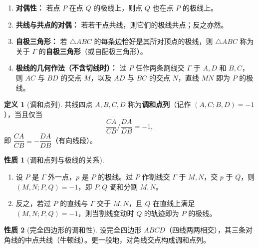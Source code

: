 \documentclass[12pt,a4paper]{ctexart}
\theoremstyle{definition}
\newtheorem*{defn}{定义}
\newtheorem*{prop}{性质}
\begin{document}
\begin{knowledgebox}
\begin{enumerate}[label=\textbf{(\arabic*)},leftmargin=2em]
  \item \textbf{对偶性：} 若点 $P$ 在点 $Q$ 的极线上，则点 $Q$ 也在点 $P$ 的极线上。
  \item \textbf{共线与共点的对偶：} 若若干点共线，则它们的极线共点；反之亦然。
  \item \textbf{自极三角形：} 若 $\triangle ABC$ 的每条边恰好是其所对顶点的极线，则 $\triangle ABC$ 称为关于 $\Gamma$ 的\textbf{自极三角形}（或自配极三角形）。
  \item \textbf{极线的几何作法（不含切线时）：} 过 $P$ 任作两条割线交 $\Gamma$ 于 $A,D$ 和 $B,C$，则 $AC$ 与 $BD$ 的交点 $M$，以及 $AD$ 与 $BC$ 的交点 $N$，直线 $MN$ 即为 $P$ 的极线。
\end{enumerate}
\end{knowledgebox}

\begin{knowledgebox}
\begin{defn}[调和点列]
共线四点 $A,B,C,D$ 称为\textbf{调和点列}（记作 $(A,C;B,D)=-1$），当且仅当
\[
  \frac{CA}{CB}\bigg/\frac{DA}{DB}=-1,
\]
即 $\dfrac{CA}{CB}=-\dfrac{DA}{DB}$（有向线段）。
\end{defn}

\begin{prop}[调和点列与极线的关系]
\begin{enumerate}[label=(\arabic*),leftmargin=2em]
  \item 设 $P$ 是 $\Gamma$ 外一点，$p$ 是 $P$ 的极线。过 $P$ 作割线交 $\Gamma$ 于 $M,N$，交 $p$ 于 $Q$，则 $(M,N;P,Q)=-1$，即 $P,Q$ 调和分割 $M,N$。
  \item 反之，若过 $P$ 的直线与 $\Gamma$ 交于 $M,N$，且 $Q$ 在直线上满足 $(M,N;P,Q)=-1$，则当割线变动时 $Q$ 的轨迹即为 $P$ 的极线。
\end{enumerate}
\end{prop}

\begin{prop}[完全四边形的调和性]
设完全四边形 $ABCD$（四线两两相交），其三条对角线的中点共线（牛顿线）。更一般地，对角线交点构成调和点列。
\end{prop}
\end{knowledgebox}
\end{document}
